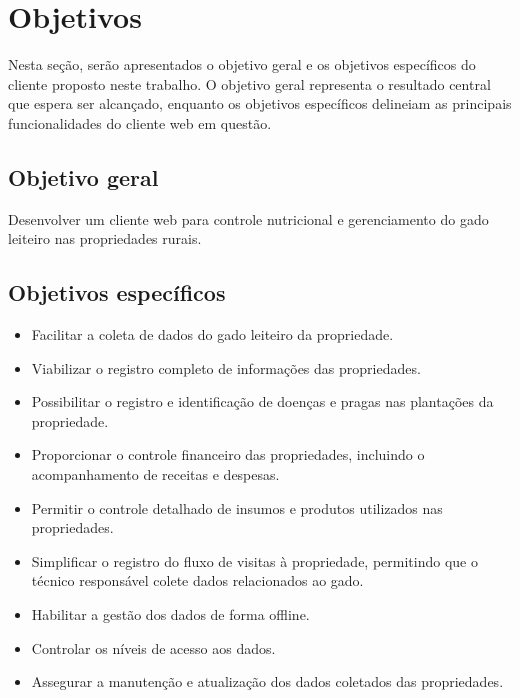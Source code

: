 \section{Objetivos}\label{sec:objetivos}

Nesta seção, serão apresentados o objetivo geral e os objetivos específicos do cliente proposto neste trabalho. O objetivo geral representa o resultado central que espera ser alcançado, enquanto os objetivos específicos delineiam as principais funcionalidades do cliente web em questão.

\subsection{Objetivo geral}\label{subsec:objetivoGeral}

Desenvolver um cliente web para controle nutricional e gerenciamento do gado leiteiro nas propriedades rurais.

\subsection{Objetivos específicos}\label{subsec:objetivosEspecificos}

\begin{itemize}
  \item Facilitar a coleta de dados do gado leiteiro da propriedade.

  \item Viabilizar o registro completo de informações das propriedades.

  \item Possibilitar o registro e identificação de doenças e pragas nas plantações da propriedade.

  \item Proporcionar o controle financeiro das propriedades, incluindo o acompanhamento de receitas e despesas.

  \item Permitir o controle detalhado de insumos e produtos utilizados nas propriedades.

  \item Simplificar o registro do fluxo de visitas à propriedade, permitindo que o técnico responsável colete dados relacionados ao gado.

  \item Habilitar a gestão dos dados de forma offline.

  \item Controlar os níveis de acesso aos dados.

  \item Assegurar a manutenção e atualização dos dados coletados das propriedades.
\end{itemize}

